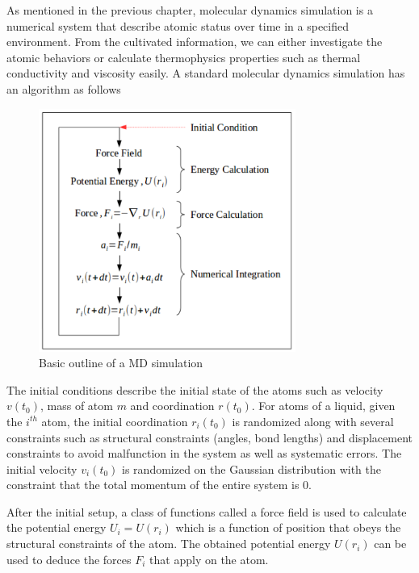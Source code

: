 As mentioned in the previous chapter, molecular dynamics simulation is 
a numerical system that describe atomic status over time in a specified 
environment. From the cultivated information, we can either investigate 
the atomic behaviors or calculate thermophysics properties such as thermal 
conductivity and viscosity easily. A standard molecular dynamics simulation 
has an algorithm as follows \cite{manjunatha_development_2018}
\begin{figure}
    \begin{center}
        \includegraphics[width=0.75\textwidth]{mdalgo.png}
    \end{center}
    \caption{Basic outline of a MD simulation}
\end{figure}
\newpage
The initial conditions describe the initial state of the atoms such as 
velocity $v(t_0)$, mass of atom $m$ and coordination $r(t_0)$. For atoms of a liquid, given the $i^{th}$ atom, 
the initial coordination $r_i(t_0)$ is randomized along with several 
constraints such as structural constraints (angles, bond lengths) 
and displacement constraints to avoid malfunction in the system as well as 
systematic errors. The initial velocity $v_i(t_0)$ is randomized on the Gaussian 
distribution with the constraint that the total momentum of the entire system 
is $0$.

After the initial setup, a class of functions called a force field is used 
to calculate the potential energy $U_i = U(r_i)$ which is a function of position 
that obeys the structural constraints of the atom. The obtained potential 
energy $U(r_i)$ can be used to deduce the forces $F_i$ that apply on the atom.

